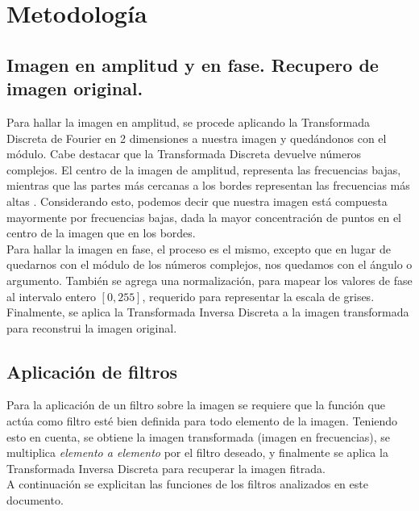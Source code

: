 \documentclass[twocolumn,a4paper,10pt]{article}
\begin{document}
\section{Metodolog\'ia}
\label{sec:metodologia}

\subsection{Imagen en amplitud y en fase. Recupero de imagen original.}

Para hallar la imagen en amplitud, se procede aplicando la Transformada Discreta de Fourier en 2 dimensiones a nuestra imagen y qued\'andonos con el 
m\'odulo. Cabe destacar que la Transformada Discreta devuelve n\'umeros complejos. El centro de la imagen de amplitud, representa las frecuencias bajas, 
mientras que las partes más cercanas a los bordes representan las frecuencias m\'as altas \cite{HIPR2-FourierTransform}. Considerando esto, podemos decir que nuestra imagen est\'a compuesta
mayormente por frecuencias bajas, dada la mayor concentraci\'on de puntos en el centro de la imagen que en los bordes.\\

Para hallar la imagen en fase, el proceso es el mismo, excepto que en lugar de quedarnos con el m\'odulo de los n\'umeros complejos, nos quedamos con el 
\'angulo o argumento. Tambi\'en se agrega una normalizaci\'on, para mapear los valores de fase al intervalo entero $[0, 255]$, 
requerido para representar la escala de grises.\\

Finalmente, se aplica la Transformada Inversa Discreta a la imagen transformada para reconstrui la imagen original.\\

\subsection{Aplicaci\'on de filtros}
\label{sec:aplicacionFiltros}

Para la aplicaci\'on de un filtro sobre la imagen se requiere que la funci\'on que act\'ua como filtro est\'e bien definida para todo elemento de la imagen.
Teniendo esto en cuenta, se obtiene la imagen transformada (imagen en frecuencias), se multiplica \textit{elemento a elemento} por el filtro deseado, y 
finalmente se aplica la Transformada Inversa Discreta para recuperar la imagen fitrada. \\

A continuaci\'on se explicitan las funciones de los filtros analizados en este documento. \\
\end{document}
